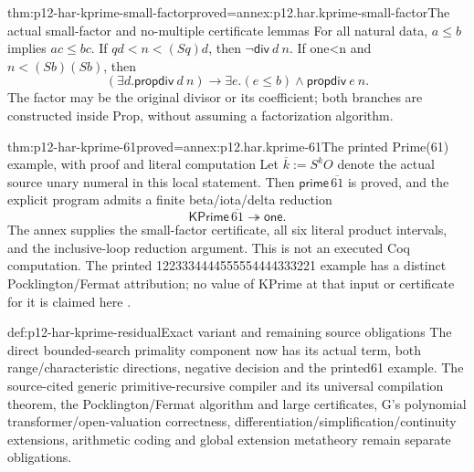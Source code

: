 \begin{hblemma}{thm:p12-har-kprime-small-factor}{proved=annex:p12.har.kprime-small-factor}{The actual small-factor and no-multiple certificate lemmas}
For all natural data, \(a\le b\) implies \(ac\le bc\).
If \(qd<n<(S q)d\), then \(\neg\mathsf{div}\ d\ n\).
If one<n and \(n<(S b)(S b)\), then
\[
 (\exists d.\mathsf{propdiv}\ d\ n)\to
        \exists e.(e\le b)\wedge\mathsf{propdiv}\ e\ n.
\]
The factor may be the original divisor or its coefficient; both branches
are constructed inside Prop, without assuming a factorization algorithm.
\end{hblemma}

\begin{hbtheorem}{thm:p12-har-kprime-61}{proved=annex:p12.har.kprime-61}{The printed Prime(61) example, with proof and literal computation}
Let \(\overline{k}:=S^k O\) denote the actual source unary numeral in this
local statement. Then \(\mathsf{prime}\,\overline{61}\) is proved,
and the explicit program admits a finite beta/iota/delta reduction
\[
 \mathsf{KPrime}\,\overline{61}\twoheadrightarrow\mathsf{one}.
\]
The annex supplies the small-factor certificate, all six literal product
intervals, and the inclusive-loop reduction argument. This is not an
executed Coq computation. The printed
1223334444555554444333221 example has a distinct Pocklington/Fermat
attribution; no value of KPrime at that input or certificate for it is
claimed here \cite[pp.~1220,1223]{BarendregtGeuvers2001}.
\end{hbtheorem}

\begin{proofboundary}{def:p12-har-kprime-residual}{Exact variant and remaining source obligations}
The direct bounded-search primality component now has its actual term,
both range/characteristic directions, negative decision and the printed61
example. The source-cited generic primitive-recursive compiler and its
universal compilation theorem, the Pocklington/Fermat algorithm and large
certificates, G's polynomial transformer/open-valuation correctness,
differentiation/simplification/continuity extensions, arithmetic coding
and global extension metatheory remain separate obligations.
\end{proofboundary}
